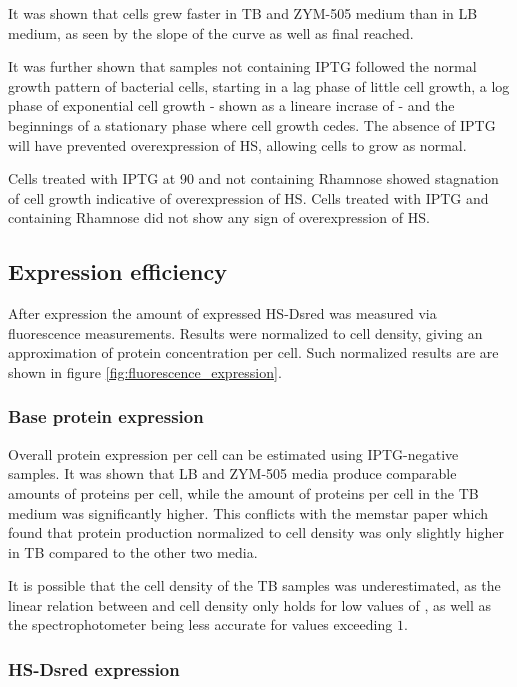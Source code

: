 It was shown that cells grew faster in TB and ZYM-505 medium than in LB medium,
as seen by the slope of the curve as well as final \odbact reached.

It was further shown that samples not containing IPTG followed the normal
growth pattern of bacterial cells, starting in a lag phase of little cell
growth, a log phase of exponential cell growth - shown as a lineare incrase of
\odbact - and the beginnings of a stationary phase where cell growth cedes. The
absence of IPTG will have prevented overexpression of HS, allowing cells to
grow as normal.

Cells treated with IPTG at \SI{90}{\min} and not containing Rhamnose showed
stagnation of cell growth indicative of overexpression of HS. Cells treated
with IPTG and containing Rhamnose did not show any sign of overexpression of
HS.

\subsection{Expression efficiency}

After expression the amount of expressed HS-Dsred was measured via fluorescence
measurements. Results were normalized to cell density, giving an approximation
of protein concentration per cell. Such normalized results are are shown in
figure \ref{fig:fluorescence_expression}.

\subsubsection{Base protein expression}

Overall protein expression per cell can be estimated using IPTG-negative
samples. It was shown that LB and ZYM-505 media produce comparable amounts of
proteins per cell, while the amount of proteins per cell in the TB medium was
significantly higher. This conflicts with the memstar paper which found that
protein production normalized to cell density was only slightly higher in TB
compared to the other two media. \cite{memstar}

It is possible that the cell density of the TB samples was underestimated, as
the linear relation between \odbact and cell density only holds for low values
of \odbact, as well as the spectrophotometer being less accurate for values
exceeding $1$.

\subsubsection{HS-Dsred expression}

